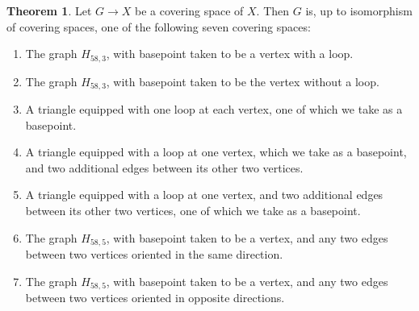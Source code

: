 \documentclass[10pt]{article}
\theoremstyle{definition}
\newtheorem{theorem}[lemma]{Theorem}
\begin{document}
\begin{theorem}
Let $G \to X$ be a covering space of $X$. Then $G$ is, up to isomorphism of covering spaces, one of the following seven covering spaces:
\begin{enumerate}
\item The graph $H_{58,3}$, with basepoint taken to be a vertex with a loop.
\item The graph $H_{58,3}$, with basepoint taken to be the vertex without a loop.
\item A triangle equipped with one loop at each vertex, one of which we take as a basepoint.
\item A triangle equipped with a loop at one vertex, which we take as a basepoint, and two additional edges between its other two vertices.
\item A triangle equipped with a loop at one vertex, and two additional edges between its other two vertices, one of which we take as a basepoint.
\item The graph $H_{58,5}$, with basepoint taken to be a vertex, and any two edges between two vertices oriented in the same direction.
\item The graph $H_{58,5}$, with basepoint taken to be a vertex, and any two edges between two vertices oriented in opposite directions.
\end{enumerate}
\end{theorem}
\end{document}
